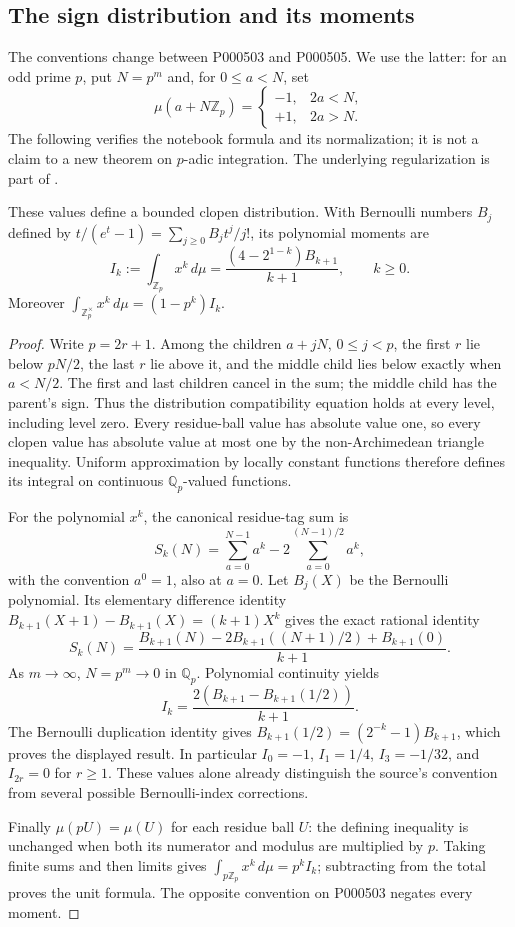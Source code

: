 \subsection{The sign distribution and its moments}
The conventions change between P000503 and P000505. We use the latter: for an odd
prime \(p\), put \(N=p^m\) and, for \(0\le a<N\), set
\[
 \mu(a+N\mathbb Z_p)=\begin{cases}-1,&2a<N,\\+1,&2a>N.\end{cases}
\]
The following verifies the notebook formula and its normalization; it is not a
claim to a new theorem on \(p\)-adic integration. The underlying regularization is
part of \citet[\S8.4]{manin1973periods}.

\begin{proposition}\ours\quad
These values define a bounded clopen distribution. With Bernoulli numbers
\(B_j\) defined by \(t/(e^t-1)=\sum_{j\ge0}B_jt^j/j!\), its polynomial moments are
\[
 I_k:=\int_{\mathbb Z_p}x^k\,d\mu
   =\frac{(4-2^{1-k})B_{k+1}}{k+1},\qquad k\ge0.
\]
Moreover \(\int_{\mathbb Z_p^\times}x^k\,d\mu=(1-p^k)I_k\).
\end{proposition}
\begin{proof}
Write \(p=2r+1\). Among the children \(a+jN\), \(0\le j<p\), the first \(r\)
lie below \(pN/2\), the last \(r\) lie above it, and the middle child lies below
exactly when \(a<N/2\). The first and last children cancel in the sum; the middle
child has the parent's sign. Thus the distribution compatibility equation holds
at every level, including level zero. Every residue-ball value has absolute value one, so every clopen value has absolute value at most one by the non-Archimedean triangle inequality.
Uniform approximation by locally constant functions therefore defines its
integral on continuous \(\mathbb Q_p\)-valued functions.

For the polynomial \(x^k\), the canonical residue-tag sum is
\[
 S_k(N)=\sum_{a=0}^{N-1}a^k-2\sum_{a=0}^{(N-1)/2}a^k,
\]
with the convention \(a^0=1\), also at \(a=0\). Let
\(B_j(X)\) be the Bernoulli polynomial. Its elementary difference identity
\(B_{k+1}(X+1)-B_{k+1}(X)=(k+1)X^k\) gives the exact rational identity
\[
 S_k(N)=\frac{B_{k+1}(N)-2B_{k+1}((N+1)/2)+B_{k+1}(0)}{k+1}.
\]
As \(m\to\infty\), \(N=p^m\to0\) in \(\mathbb Q_p\). Polynomial continuity yields
\[
 I_k=\frac{2(B_{k+1}-B_{k+1}(1/2))}{k+1}.
\]
The Bernoulli duplication identity gives
\(B_{k+1}(1/2)=(2^{-k}-1)B_{k+1}\), which proves the displayed result.
In particular \(I_0=-1\), \(I_1=1/4\), \(I_3=-1/32\), and \(I_{2r}=0\) for
\(r\ge1\). These values alone already distinguish the source's convention from
several possible Bernoulli-index corrections.

Finally \(\mu(pU)=\mu(U)\) for each residue ball \(U\): the defining inequality
is unchanged when both its numerator and modulus are multiplied by \(p\).
Taking finite sums and then limits gives
\(\int_{p\mathbb Z_p}x^k\,d\mu=p^kI_k\); subtracting from the total proves the
unit formula. The opposite convention on P000503 negates every moment.
\end{proof}

